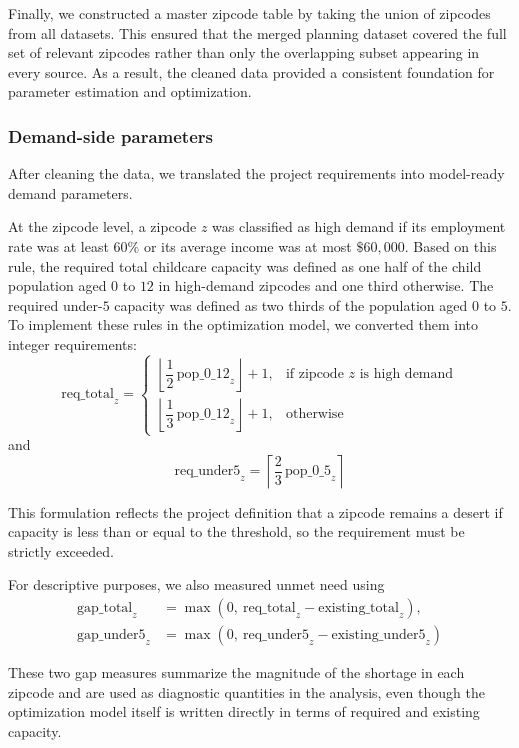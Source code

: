 \documentclass[11pt]{article}
\newcommand{\1}{\mathbb{I}}
\begin{document}
Finally, we constructed a master zipcode table by taking the union of zipcodes from all datasets. This ensured that the merged planning dataset covered the full set of relevant zipcodes rather than only the overlapping subset appearing in every source. As a result, the cleaned data provided a consistent foundation for parameter estimation and optimization.

\subsubsection{Demand-side parameters}

After cleaning the data, we translated the project requirements into model-ready demand parameters.

At the zipcode level, a zipcode \(z\) was classified as high demand if its employment rate was at least \(60\%\) or its average income was at most \(\$60{,}000\). Based on this rule, the required total childcare capacity was defined as one half of the child population aged \(0\) to \(12\) in high-demand zipcodes and one third otherwise. The required under-\(5\) capacity was defined as two thirds of the population aged \(0\) to \(5\). To implement these rules in the optimization model, we converted them into integer requirements:
\[
\mathrm{req\_total}_z =
\begin{cases}
\left\lfloor \dfrac{1}{2}\,\mathrm{pop\_0\_12}_z \right\rfloor + 1, & \text{if zipcode } z \text{ is high demand}\\[1.2ex]
\left\lfloor \dfrac{1}{3}\,\mathrm{pop\_0\_12}_z \right\rfloor + 1, & \text{otherwise}
\end{cases}
\]
and
\[
\mathrm{req\_under5}_z = \left\lceil \dfrac{2}{3}\,\mathrm{pop\_0\_5}_z \right\rceil
\]

This formulation reflects the project definition that a zipcode remains a desert if capacity is less than or equal to the threshold, so the requirement must be strictly exceeded.

For descriptive purposes, we also measured unmet need using
\[
\begin{aligned}
\mathrm{gap\_total}_z &= \max\!\left(0,\ \mathrm{req\_total}_z - \mathrm{existing\_total}_z\right),\\
\mathrm{gap\_under5}_z &= \max\!\left(0,\ \mathrm{req\_under5}_z - \mathrm{existing\_under5}_z\right)
\end{aligned}
\]

These two gap measures summarize the magnitude of the shortage in each zipcode and are used as diagnostic quantities in the analysis, even though the optimization model itself is written directly in terms of required and existing capacity.
\end{document}
